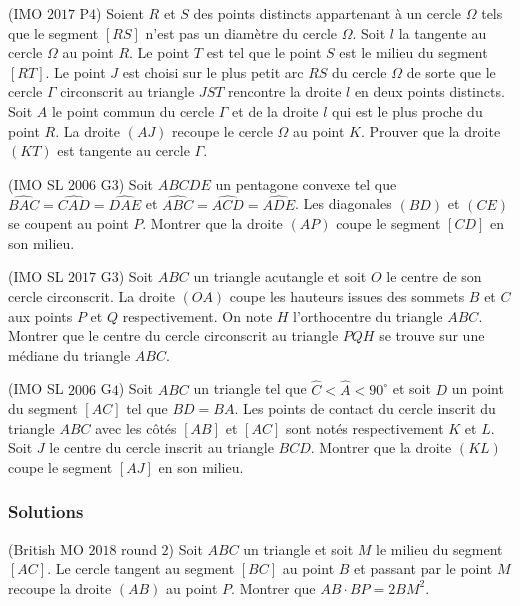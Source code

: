 \begin{exo}
(IMO $2017$ P$4$)
Soient $R$ et $S$ des points distincts appartenant à un cercle $\Omega$ tels que le segment $[RS]$ n'est pas un diamètre du cercle $\Omega$. Soit $l$ la tangente au cercle $\Omega$ au point $R$. Le point $T$ est tel que le point $S$ est le milieu du segment $[RT]$. Le point $J$ est choisi sur le plus petit arc $RS$ du cercle $\Omega$ de sorte que le cercle $\Gamma$ circonscrit au triangle $JST$ rencontre la droite $l$ en deux points distincts. Soit $A$ le point commun du cercle $\Gamma$ et de la droite $l$ qui est le plus proche du point $R$. La droite $(AJ)$ recoupe le cercle $\Omega$ au point $K$. Prouver que la droite $(KT)$ est tangente au cercle $\Gamma$.
\end{exo}


\begin{exo}
(IMO SL $2006$ G$3$)
Soit $ABCDE$ un pentagone convexe tel que
$\widehat{BAC}=\widehat{CAD}=\widehat{DAE}$ et $\widehat{ABC}=\widehat{ACD}=\widehat{ADE}$.
Les diagonales $(BD)$ et $(CE)$ se coupent au point $P$. Montrer que la droite $(AP)$ coupe le segment $[CD]$ en son milieu.
\end{exo}


\begin{exo}
(IMO SL $2017$ G$3$)
Soit $ABC$ un triangle acutangle et soit $O$ le centre de son cercle circonscrit. La droite $(OA)$ coupe les hauteurs issues des sommets $B$ et $C$ aux points $P$ et $Q$ respectivement. On note $H$ l'orthocentre du triangle $ABC$. Montrer que le centre du cercle circonscrit au triangle $PQH$ se trouve sur une médiane du triangle $ABC$.
\end{exo}


\begin{exo}
(IMO SL $2006$ G$4$)
Soit $ABC$ un triangle tel que $\widehat{C}<\widehat{A}<90^\circ$ et soit $D$ un point du segment $[AC]$ tel que $BD=BA$. Les points de contact du cercle inscrit du triangle $ABC$ avec les côtés $[AB]$ et $[AC]$ sont notés respectivement $K$ et $L$. Soit $J$ le centre du cercle inscrit au triangle $BCD$. Montrer que la droite $(KL)$ coupe le segment $[AJ]$ en son milieu.
\end{exo}


\subsubsection{Solutions}


\setcounter{exo}{0}


\begin{exo}
(British MO $2018$ round $2$)
Soit $ABC$ un triangle et soit $M$ le milieu du segment $[AC]$. Le cercle tangent au segment $[BC]$ au point $B$ et passant par le point $M$ recoupe la droite $(AB)$ au point $P$. Montrer que $AB\cdot BP=2BM^2$.
\end{exo}


